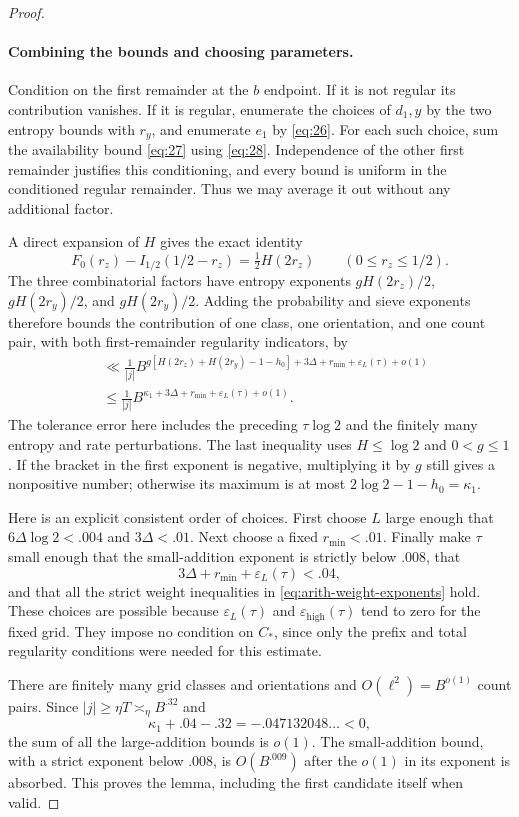 \begin{proof}
\paragraph{Combining the bounds and choosing parameters.}
Condition on the first remainder at the $b$ endpoint.  If it is not
regular its contribution vanishes.  If it is regular, enumerate the
choices of $d_1,y$ by the two entropy bounds with $r_y$, and enumerate
$e_1$ by \eqref{eq:26}.  For each such choice, sum the availability
bound \eqref{eq:27} using \eqref{eq:28}.  Independence of the other
first remainder justifies this conditioning, and every bound is
uniform in the conditioned regular remainder.  Thus we may average
it out without any additional factor.

A direct expansion of $H$ gives the exact identity
\[
 F_0(r_z)-I_{1/2}(1/2-r_z)=\tfrac12H(2r_z)
        \qquad(0\le r_z\le1/2).
\]
The three combinatorial factors have entropy exponents
$gH(2r_z)/2$, $gH(2r_y)/2$, and $gH(2r_y)/2$.  Adding the probability and
sieve exponents therefore bounds the contribution of one class,
one orientation, and one count pair, with both first-remainder
regularity indicators, by
\begin{equation}
 \begin{split}
 &\ll \frac1{|j|}
 B^{g[H(2r_z)+H(2r_y)-1-h_0]
             +3\Delta+r_{\min}+\varepsilon_L(\tau)+o(1)}\\
 &\le \frac1{|j|}
 B^{\kappa_1+3\Delta+r_{\min}
                         +\varepsilon_L(\tau)+o(1)}.
 \end{split}
 \label{eq:29}
\end{equation}
The tolerance error here includes the preceding $\tau\log2$ and the
finitely many entropy and rate perturbations.  The last inequality
uses $H\le\log2$ and $0<g\le1$.  If the bracket in the first exponent
is negative, multiplying it by $g$ still gives a nonpositive number;
otherwise its maximum is at most
$2\log2-1-h_0=\kappa_1$.

Here is an explicit consistent order of choices.  First choose $L$
large enough that $6\Delta\log2<.004$ and $3\Delta<.01$.
Next choose a fixed $r_{\min}<.01$.  Finally make $\tau$ small enough
that the small-addition exponent is strictly below $.008$, that
\[
 3\Delta+r_{\min}+\varepsilon_L(\tau)<.04,
\]
and that all the strict weight inequalities in
\eqref{eq:arith-weight-exponents} hold.
These choices are possible because $\varepsilon_L(\tau)$ and
$\varepsilon_{\mathrm{high}}(\tau)$ tend to zero for the fixed grid.
They impose no condition on $C_*$, since only the prefix and total
regularity conditions were needed for this estimate.

There are finitely many grid classes and orientations and
$O(\ell^2)=B^{o(1)}$ count pairs.  Since
$|j|\ge\eta T\asymp_\eta B^{.32}$ and
\[
 \kappa_1+.04-.32=-.047132048\ldots<0,
\]
the sum of all the large-addition bounds is $o(1)$.
The small-addition bound, with a strict exponent below $.008$, is
$O(B^{.009})$ after the $o(1)$ in its exponent is absorbed.
This proves the lemma, including the first candidate itself when valid.
\end{proof}

